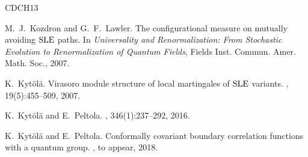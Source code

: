 \documentclass[oneside,english]{amsart}
\numberwithin{equation}{section}
\numberwithin{figure}{section}
\theoremstyle{plain}
\theoremstyle{plain}
\theoremstyle{plain}
\theoremstyle{remark}
\theoremstyle{plain}
\theoremstyle{plain}
\theoremstyle{plain}
\theoremstyle{plain}
\theoremstyle{plain}
\theoremstyle{plain}
\theoremstyle{plain}
\theoremstyle{plain}
\begin{document}
\begin{thebibliography}{CDCH{\etalchar{+}}13}




M.~J.~Kozdron and G.~F.~Lawler.
\newblock The configurational measure on mutually avoiding $\mathrm{SLE}$ paths.
\newblock In {\em Universality and Renormalization: From Stochastic Evolution
  to Renormalization of Quantum Fields}, Fields Inst. Commun. Amer.
  Math. Soc., 2007.

K.~Kyt{\"o}l{\"a}.
\newblock Virasoro module structure of local martingales of $\mathrm{SLE}$ variants.
, 19(5):455--509, 2007.

K.~Kyt{\"o}l{\"a} and E.~Peltola.
, 346(1):237--292, 2016.

K.~Kyt{\"o}l{\"a} and E.~Peltola.
\newblock Conformally covariant boundary correlation functions with a quantum group.
, to appear, 2018.




\end{thebibliography}
\end{document}
